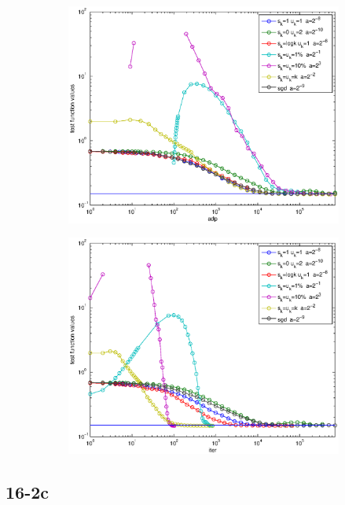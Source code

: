 \documentclass[12pt]{article}
\begin{document}
	\begin{figure}[H]
	\begin{subfigure}[b]{.5\linewidth}
		        \includegraphics[width=4in]{GenFigures/16-2b-1.eps}
	\end{subfigure}%
	\begin{subfigure}[b]{.5\linewidth}
		        \includegraphics[width=4in]{GenFigures/16-2b-2.eps}
	\end{subfigure}%

	\end{figure}
	
	\subsection{16-2c}
\end{document}
